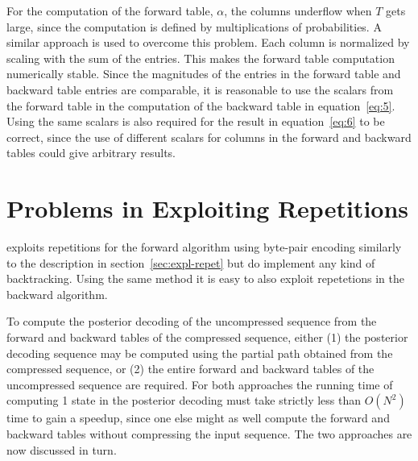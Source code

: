 For the computation of the forward table, $\alpha$, the columns underflow when
$T$ gets large, since the computation is defined by multiplications of
probabilities. A similar approach is used to overcome this problem. Each column
is normalized by scaling with the sum of the entries. This makes the forward
table computation numerically stable. Since the magnitudes of the entries in
the forward table and backward table entries are comparable, it is reasonable
to use the scalars from the forward table in the computation of the backward
table in equation~\eqref{eq:5}. Using the same scalars is also required for the
result in equation~\eqref{eq:6} to be correct, since the use of different
scalars for columns in the forward and backward tables could give arbitrary
results.



\section{Problems in Exploiting Repetitions}
\label{sec:probl-expl-repet}

\citet{sand2013ziphmmlib} exploits repetitions for the forward algorithm using
byte-pair encoding similarly to the description in
section~\ref{sec:expl-repet} but do implement any kind of backtracking. Using
the same method it is easy to also exploit repetetions in the backward
algorithm.

To compute the posterior decoding of the uncompressed sequence from the
forward and backward tables of the compressed sequence, either (1) the
posterior decoding sequence may be computed using the partial path obtained
from the compressed sequence, or (2) the entire forward and backward tables of
the uncompressed sequence are required. For both approaches the running time of
computing 1 state in the posterior decoding must take strictly less than
$O(N^2)$ time to gain a speedup, since one else might as well compute the
forward and backward tables without compressing the input sequence. The two
approaches are now discussed in turn.

